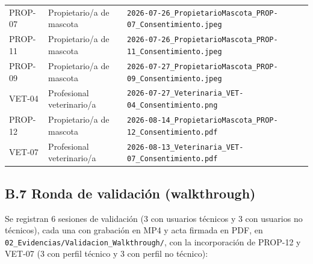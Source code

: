 \documentclass[journal,onecolumn]{IEEEtran}
\begin{document}
\begin{table}[H]
\begin{tabularx}{\textwidth}{@{}l l X@{}}
			PROP-07 & Propietario/a de mascota & \texttt{2026-07-26\_PropietarioMascota\_PROP-07\_Consentimiento.jpeg} \\
			
			PROP-11 & Propietario/a de mascota & \texttt{2026-07-26\_PropietarioMascota\_PROP-11\_Consentimiento.jpeg} \\
			
			PROP-09 & Propietario/a de mascota & \texttt{2026-07-27\_PropietarioMascota\_PROP-09\_Consentimiento.jpeg} \\
			
			VET-04 & Profesional veterinario/a & \texttt{2026-07-27\_Veterinaria\_VET-04\_Consentimiento.png} \\
			
			PROP-12 & Propietario/a de mascota & \texttt{2026-08-14\_PropietarioMascota\_PROP-12\_Consentimiento.pdf} \\
			
			VET-07 & Profesional veterinario/a & \texttt{2026-08-13\_Veterinaria\_VET-07\_Consentimiento.pdf} \\
			
			\bottomrule
		\end{tabularx}
	\end{table}
	
	
	\subsection*{B.7 Ronda de validación (walkthrough)}
	
	Se registran 6 sesiones de validación (3 con usuarios
	técnicos y 3 con usuarios no técnicos), cada una con grabación en MP4 y
	acta firmada en PDF, en \texttt{02\_Evidencias/Validacion\_Walkthrough/},
	con la incorporación de PROP-12 y VET-07 (3 con perfil técnico y
	3 con perfil no técnico):
	
\end{document}
